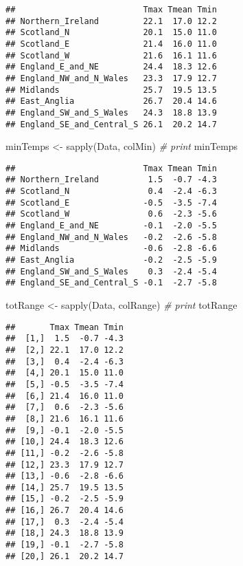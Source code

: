 \documentclass[
]{article}
\newenvironment{Shaded}{\begin{snugshade}}{\end{snugshade}}
\newcommand{\CommentTok}[1]{\textcolor[rgb]{0.56,0.35,0.01}{\textit{#1}}}
\newcommand{\FunctionTok}[1]{\textcolor[rgb]{0.00,0.00,0.00}{#1}}
\newcommand{\NormalTok}[1]{#1}
\newcommand{\OtherTok}[1]{\textcolor[rgb]{0.56,0.35,0.01}{#1}}
\begin{document}
\begin{verbatim}
##                          Tmax Tmean Tmin
## Northern_Ireland         22.1  17.0 12.2
## Scotland_N               20.1  15.0 11.0
## Scotland_E               21.4  16.0 11.0
## Scotland_W               21.6  16.1 11.6
## England_E_and_NE         24.4  18.3 12.6
## England_NW_and_N_Wales   23.3  17.9 12.7
## Midlands                 25.7  19.5 13.5
## East_Anglia              26.7  20.4 14.6
## England_SW_and_S_Wales   24.3  18.8 13.9
## England_SE_and_Central_S 26.1  20.2 14.7
\end{verbatim}

\begin{Shaded}
\begin{Highlighting}[]
\NormalTok{minTemps }\OtherTok{\textless{}{-}} \FunctionTok{sapply}\NormalTok{(Data, colMin)}
\CommentTok{\# print}
\NormalTok{minTemps}
\end{Highlighting}
\end{Shaded}

\begin{verbatim}
##                          Tmax Tmean Tmin
## Northern_Ireland          1.5  -0.7 -4.3
## Scotland_N                0.4  -2.4 -6.3
## Scotland_E               -0.5  -3.5 -7.4
## Scotland_W                0.6  -2.3 -5.6
## England_E_and_NE         -0.1  -2.0 -5.5
## England_NW_and_N_Wales   -0.2  -2.6 -5.8
## Midlands                 -0.6  -2.8 -6.6
## East_Anglia              -0.2  -2.5 -5.9
## England_SW_and_S_Wales    0.3  -2.4 -5.4
## England_SE_and_Central_S -0.1  -2.7 -5.8
\end{verbatim}

\begin{Shaded}
\begin{Highlighting}[]
\NormalTok{totRange }\OtherTok{\textless{}{-}} \FunctionTok{sapply}\NormalTok{(Data, colRange)}
\CommentTok{\# print}
\NormalTok{totRange}
\end{Highlighting}
\end{Shaded}

\begin{verbatim}
##       Tmax Tmean Tmin
##  [1,]  1.5  -0.7 -4.3
##  [2,] 22.1  17.0 12.2
##  [3,]  0.4  -2.4 -6.3
##  [4,] 20.1  15.0 11.0
##  [5,] -0.5  -3.5 -7.4
##  [6,] 21.4  16.0 11.0
##  [7,]  0.6  -2.3 -5.6
##  [8,] 21.6  16.1 11.6
##  [9,] -0.1  -2.0 -5.5
## [10,] 24.4  18.3 12.6
## [11,] -0.2  -2.6 -5.8
## [12,] 23.3  17.9 12.7
## [13,] -0.6  -2.8 -6.6
## [14,] 25.7  19.5 13.5
## [15,] -0.2  -2.5 -5.9
## [16,] 26.7  20.4 14.6
## [17,]  0.3  -2.4 -5.4
## [18,] 24.3  18.8 13.9
## [19,] -0.1  -2.7 -5.8
## [20,] 26.1  20.2 14.7
\end{verbatim}
\end{document}
